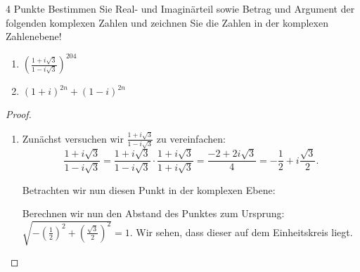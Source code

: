 \documentclass{../problemset}
\author{Michael van Straten}
\begin{document}
\maketitle


\begin{problem}{4 Punkte}
Bestimmen Sie Real- und Imaginärteil sowie Betrag und Argument der folgenden komplexen Zahlen und zeichnen Sie die Zahlen in der komplexen Zahlenebene!
\begin{enumerate}
	\item ${\left(\frac{1+i\sqrt{3}}{1-i\sqrt{3}}\right)}^{204}$
	\item $(1 + i)^{2n} + (1 - i)^{2n}$
\end{enumerate}
\begin{proof}
	\leavevmode
	\begin{enumerate}
		\item Zunächst versuchen wir $\frac{1+i\sqrt{3}}{1-i\sqrt{3}}$ zu vereinfachen:
		      \[
			      \frac{1+i\sqrt{3}}{1-i\sqrt{3}}
			      = \frac{1+i\sqrt{3}}{1-i\sqrt{3}} \cdot \frac{1+i\sqrt{3}}{1+i\sqrt{3}}
			      = \frac{-2 + 2i\sqrt{3}}{4}
			      = -\frac{1}{2} + i \frac{\sqrt{3}}{2}.
		      \]

		      Betrachten wir nun diesen Punkt in der komplexen Ebene:

		      \begin{center}
		      \end{center}

		      Berechnen wir nun den Abstand des Punktes zum Ursprung: $\sqrt{-
			      {\left(\frac{1}{2}\right)}^2 + {\left(\frac{\sqrt{3}}{2}\right)}^2} = 1$. Wir
		      sehen, dass dieser auf dem Einheitskreis liegt.

		      \begin{center}
		      \end{center}


\end{enumerate}
\end{proof}
\end{problem}
\end{document}
